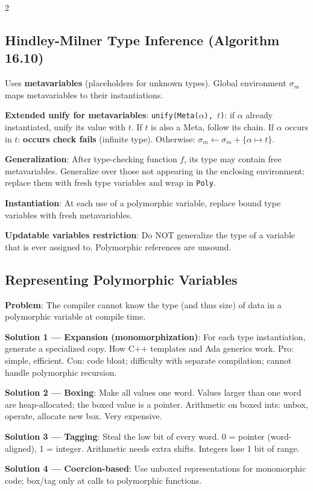 \documentclass[9pt,landscape]{extarticle}
\begin{document}
\begin{multicols}{2}
\subsection{Hindley-Milner Type Inference (Algorithm 16.10)}

Uses \textbf{metavariables} (placeholders for unknown types). Global environment $\sigma_m$ maps metavariables to their instantiations.

\textbf{Extended unify for metavariables}: \texttt{unify(Meta($\alpha$), $t$)}: if $\alpha$ already instantiated, unify its value with $t$. If $t$ is also a Meta, follow its chain. If $\alpha$ occurs in $t$: \textbf{occurs check fails} (infinite type). Otherwise: $\sigma_m \leftarrow \sigma_m + \{\alpha \mapsto t\}$.

\textbf{Generalization}: After type-checking function $f$, its type may contain free metavariables. Generalize over those not appearing in the enclosing environment: replace them with fresh type variables and wrap in \texttt{Poly}.

\textbf{Instantiation}: At each use of a polymorphic variable, replace bound type variables with fresh metavariables.

\textbf{Updatable variables restriction}: Do NOT generalize the type of a variable that is ever assigned to. Polymorphic references are unsound.

\subsection{Representing Polymorphic Variables}

\textbf{Problem}: The compiler cannot know the type (and thus size) of data in a polymorphic variable at compile time.

\textbf{Solution 1 --- Expansion (monomorphization)}: For each type instantiation, generate a specialized copy. How C++ templates and Ada generics work. Pro: simple, efficient. Con: code bloat; difficulty with separate compilation; cannot handle polymorphic recursion.

\textbf{Solution 2 --- Boxing}: Make all values one word. Values larger than one word are heap-allocated; the boxed value is a pointer. Arithmetic on boxed ints: unbox, operate, allocate new box. Very expensive.

\textbf{Solution 3 --- Tagging}: Steal the low bit of every word. 0 = pointer (word-aligned), 1 = integer. Arithmetic needs extra shifts. Integers lose 1 bit of range.

\textbf{Solution 4 --- Coercion-based}: Use unboxed representations for monomorphic code; box/tag only at calls to polymorphic functions.


\end{multicols}
\end{document}
